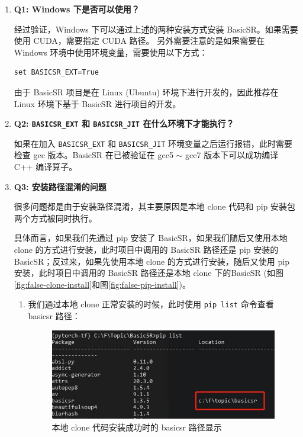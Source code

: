 \documentclass[../main.tex]{subfiles}
\begin{document}
\begin{enumerate}
    \item \textbf{Q1: Windows 下是否可以使用？}

    经过验证，Windows 下可以通过上述的两种安装方式安装 BasicSR。如果需要使用 CUDA，需要指定 CUDA 路径。	另外需要注意的是如果需要在 Windows 环境中使用环境变量，需要使用以下方式：
       \begin{verbatim}
set BASICSR_EXT=True
       \end{verbatim}

    由于 BasicSR 项目是在 Linux (Ubuntu) 环境下进行开发的，因此推荐在 Linux 环境下基于 BasicSR 进行项目的开发。

    \item \textbf{Q2: \texttt{BASICSR\_EXT} 和 \texttt{BASICSR\_JIT} 在什么环境下才能执行？}

    如果在加入 \texttt{BASICSR\_EXT} 和 \texttt{BASICSR\_JIT} 环境变量之后运行报错，此时需要检查 gcc 版本。BasicSR 在已被验证在 gcc5 $\sim$ gcc7 版本下可以成功编译 C++ 编译算子。

    \item \textbf{Q3: 安装路径混淆的问题}

    很多问题都是由于安装路径混淆，其主要原因是本地 clone 代码和 pip 安装包两个方式被同时执行。

    具体而言，如果我们先通过 pip 安装了 BasicSR，如果我们随后又使用本地 clone 的方式进行安装，此时项目中调用的 BasicSR 路径还是 pip 安装的 BasicSR；反过来，如果先使用本地 clone 的方式进行安装，随后又使用 pip 安装，此时项目中调用的 BasicSR 路径还是本地 clone 下的BasicSR (如图\ref{fig:false-clone-install}和图\ref{fig:false-pip-install})。

\begin{enumerate}
    \item 我们通过本地 clone 正常安装的时候，此时使用 \texttt{pip list} 命令查看 basicsr 路径：
    \begin{figure}[H]
    \begin{center}
        \includegraphics[width=0.7\linewidth]{figures/installation_clone_install_location.jpg}
        \caption{本地 clone 代码安装成功时的 basicsr 路径显示}
        \label{fig:correct-clone-install}
    \end{center}
    \vspace{-0.5cm}
    \end{figure}


\end{enumerate}
\end{enumerate}
\end{document}
